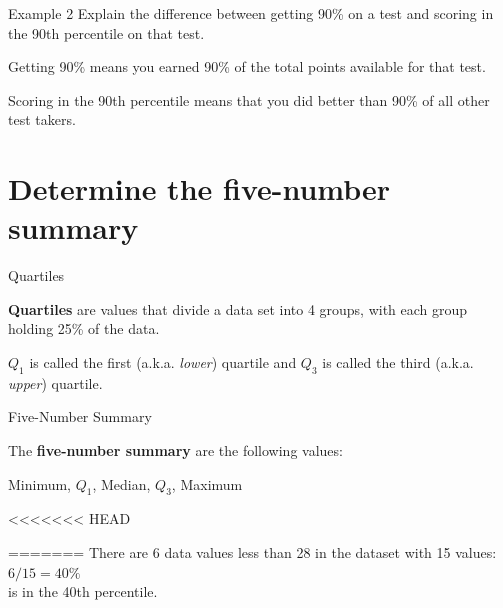 \documentclass[t]{beamer}
\begin{document}
\begin{frame}{Example 2}
Explain the difference between getting 90\% on a test and scoring in the 90th percentile on that test.	\newline\\	\pause

Getting 90\% means you earned 90\% of the total points available for that test.	\newline\\	\pause

Scoring in the 90th percentile means that you did better than 90\% of all other test takers.
\end{frame}

\section{Determine the five-number summary}

\begin{frame}{Quartiles}
\begin{tcolorbox}[colframe=green!20!black, colback = green!30!white,title=\textbf{Quartiles}]
\textbf{Quartiles} are values that divide a data set into 4 groups, with each group holding 25\% of the data.
\end{tcolorbox}
\vspace{8pt}	\pause
\begin{center}
\end{center}
\vspace{8pt} \pause
$Q_1$ is called the first (a.k.a. \textit{lower}) quartile and $Q_3$ is called the third (a.k.a. \textit{upper}) quartile.
\end{frame}

\begin{frame}{Five-Number Summary}
\begin{tcolorbox}[colframe=green!20!black, colback = green!30!white,title=\textbf{Five-Number Summary}]
The \textbf{five-number summary} are the following values: 
\begin{center}
Minimum, $Q_1$, Median, $Q_3$, Maximum
\end{center}
<<<<<<< HEAD
\end{tcolorbox}
=======
\vspace{8pt}	\pause
There are 6 data values less than 28 in the dataset with 15 values: \quad $6/15 = 40\%$	\newline\\	 is in the 40th percentile.
\end{frame}
\end{document}
